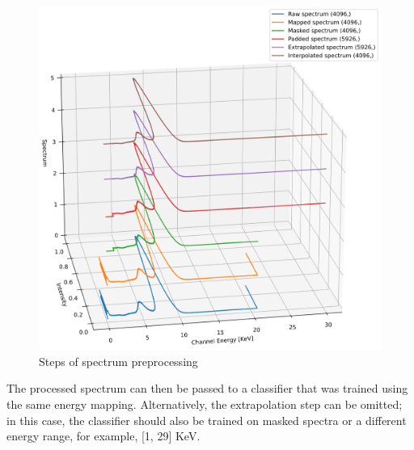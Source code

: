 \begin{figure}[H] 
  \centering     
  \includegraphics[width=1\textwidth]{img/spectrum_preprocessing.png} 
  \caption{Steps of spectrum preprocessing}
  \label{fig:spectrum_preprocessing}
\end{figure}

The processed spectrum can then be passed to a classifier that was trained using the same energy mapping. 
Alternatively, the extrapolation step can be omitted; in this case, the classifier should also be trained on masked spectra or a different energy range, for example, [1, 29] KeV.